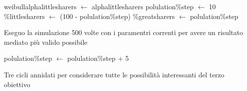 \vspace*{-10pt}
\begin{algorithm}
 \begin{algorithmic}[1]
      \State weibull\smuscore alpha\smuscore little\smuscore sharers  $\gets$ alpha\smuscore little\smuscore sharers
	\State polulation\smuscore \%\smuscore step $\gets$ 10
	  \State \%\smuscore little\smuscore sharers  $\gets$  (100 - polulation\smuscore \%\smuscore step)
	  \State \%\smuscore great\smuscore sharers  $\gets$  polulation\smuscore \%\smuscore step
	  
	  
	    \Comment Eseguo la simulazione 500 volte con i paramentri correnti per avere un risultato mediato più valido possibile
	  
	  \EndFor
	  
	  \State polulation\smuscore \%\smuscore step $\gets$ polulation\smuscore \%\smuscore step + 5
	  
	\EndWhile
      \EndFor
    \EndProcedure
 \end{algorithmic}
 
 \caption{Tre cicli annidati per considerare tutte le possibilità interessanti del terzo obiettivo}
 \label{alg:third_test}
\end{algorithm}
\vspace*{-15pt}

